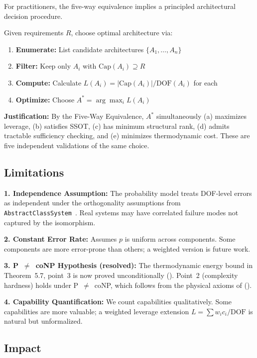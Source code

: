 For practitioners, the five-way equivalence implies a principled architectural decision procedure.

Given requirements $R$, choose optimal architecture via:
\begin{enumerate}
\item \textbf{Enumerate:} List candidate architectures $\{A_1, \ldots, A_n\}$
\item \textbf{Filter:} Keep only $A_i$ with $\mathrm{Cap}(A_i) \supseteq R$
\item \textbf{Compute:} Calculate $L(A_i) = |\mathrm{Cap}(A_i)|/\mathrm{DOF}(A_i)$ for each
\item \textbf{Optimize:} Choose $A^* = \arg\max_i L(A_i)$
\end{enumerate}

\textbf{Justification:} By the Five-Way Equivalence, $A^*$ simultaneously (a) maximizes leverage, (b) satisfies SSOT, (c) has minimum structural rank, (d) admits tractable sufficiency checking, and (e) minimizes thermodynamic cost. These are five independent validations of the same choice.

\subsection{Limitations}

\textbf{1. Independence Assumption:} The probability model treats DOF-level errors as independent under the orthogonality assumptions from \nolinkurl{AbstractClassSystem}~\cite{paper1_typing_discipline}. Real systems may have correlated failure modes not captured by the isomorphism.

\textbf{2. Constant Error Rate:} Assumes $p$ is uniform across components. Some components are more error-prone than others; a weighted version is future work.

\textbf{3. P~$\neq$~coNP Hypothesis (resolved):} The thermodynamic energy bound in Theorem~5.7, point~3 is now proved unconditionally (). Point~2 (complexity hardness) holds under P~$\neq$~coNP, which follows from the physical axioms of \cite{paper4_decision_quotient} ().

\textbf{4. Capability Quantification:} We count capabilities qualitatively. Some capabilities are more valuable; a weighted leverage extension $L = \sum w_i c_i / \mathrm{DOF}$ is natural but unformalized.

\subsection{Impact}

